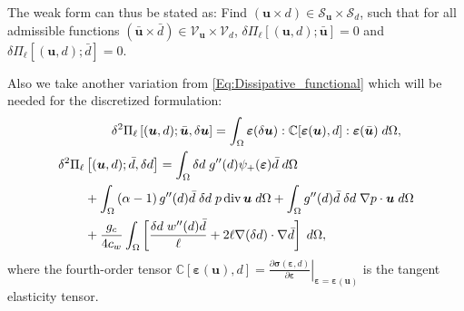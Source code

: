 The weak form can thus be stated as: Find $\left(\bm{u}\times d \right)\in\mathscr{S}_{\bm{u}}\times\mathscr{S}_d$, such that for all admissible functions $\left(\bar{\bm{u}}\times\bar{d} \right)\in\mathscr{V}_{\bm{u}}\times\mathscr{V}_d$, $\delta\Pi_\ell\left[(\bm{u},d); \bar{\bm{u}}\right]=0$ and $\delta\Pi_\ell\left[(\bm{u},d); \bar{d}\right]=0$.


Also we take another variation from \eqref{Eq:Dissipative_functional} which will be needed for the discretized formulation:
\begin{subequations}\label{Eq:Tangent}
\begin{align}\label{Eq:Tangent_u}
\begin{split}
        \delta^2 \Pi_\ell & \left[(\bm{u}, d); \bar{\bm{u}}, \delta \bm{u}\right]
        = \int_\Omega \bm{\varepsilon}(\delta\bm{u}): \mathbb{C}[\bm{\varepsilon}(\bm{u}), d] : \bm{\varepsilon}(\bar{\bm{u}})  \;d\Omega,
        \end{split}\\
        \begin{split}
	            \delta^2 \Pi_\ell & \left[(\bm{u}, d);  \bar{d},  \delta d\right]
	    =  \int_\Omega \delta d \;g''(d) \psi_+(\bm{\varepsilon}) \bar d \; d\Omega\\ 
	    & +\int_{\Omega} \left(\alpha-1\right) g''(d)\bar{d} \; \delta d \; {p} \operatorname{div} {{\bm{u}}} \; d\Omega +\int_{\Omega}  g''(d)\bar{d} \; \delta d \; \nabla {p} \cdot {{\bm{u}}} \; d\Omega 
	    \\& +
	    \frac{g_c}{4c_w} \int_\Omega  \left[\frac{\delta d \; w''(d) \bar{d}}{\ell} + 2\ell \nabla (\delta d) \cdot \nabla \bar d \right]\;d\Omega,
	    \end{split}
\end{align}
\end{subequations}
where the fourth-order tensor $\mathbb{C}[\bm{\varepsilon}(\bm{u}), d] = \left.\frac{\partial \bm{\sigma}(\bm{\varepsilon}, d)}{\partial \bm{\varepsilon}}\right|_{\bm{\varepsilon}=\bm{\varepsilon}(\bm{u})}$ is the tangent elasticity tensor.

